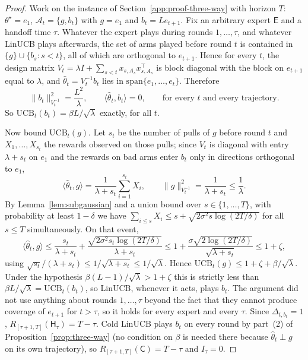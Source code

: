 \documentclass{article}
\theoremstyle{definition}
\theoremstyle{remark}
\theoremstyle{remark}
\newcommand{\Cold}{\mathsf{C}}
\newcommand{\Exp}{\mathsf{E}}
\newcommand{\Hyb}{\mathsf{H}}
\begin{document}
\begin{proof}
Work on the instance of Section~\ref{app:proof-three-way} with horizon $T$:
$\theta^\star=e_1$, $\mathcal A_t=\{g,b_t\}$ with $g=e_1$ and
$b_t=Le_{t+1}$. Fix an arbitrary expert $\Exp$ and a handoff time $\tau$.
Whatever the expert plays during rounds $1,\dots,\tau$, and whatever LinUCB
plays afterwards, the set of arms played before round $t$ is contained in
$\{g\}\cup\{b_s:s<t\}$, all of which are orthogonal to $e_{t+1}$. Hence for
every $t$, the design matrix $V_t=\lambda I+\sum_{s<t}x_{s,A_s}x_{s,A_s}^\top$
is block diagonal with the block on $e_{t+1}$ equal to $\lambda$, and
$\widehat\theta_t=V_t^{-1}b_t$ lies in $\mathrm{span}\{e_1,\dots,e_t\}$. Therefore
\[
\|b_t\|_{V_t^{-1}}^2=\frac{L^2}{\lambda},\qquad \langle\widehat\theta_t,b_t\rangle=0,
\qquad\text{for every }t\text{ and every trajectory.}
\]
So $\mathrm{UCB}_t(b_t)=\beta L/\sqrt\lambda$ exactly, for all $t$.

Now bound $\mathrm{UCB}_t(g)$. Let $s_t$ be the number of pulls of $g$ before
round $t$ and $X_1,\dots,X_{s_t}$ the rewards observed on those pulls; since
$V_t$ is diagonal with entry $\lambda+s_t$ on $e_1$ and the rewards on bad
arms enter $b_t$ only in directions orthogonal to $e_1$,
\[
\langle\widehat\theta_t,g\rangle=\frac{1}{\lambda+s_t}\sum_{i=1}^{s_t}X_i,
\qquad
\|g\|_{V_t^{-1}}^2=\frac{1}{\lambda+s_t}\le\frac1\lambda .
\]
By Lemma~\ref{lem:subgaussian} and a union bound over $s\in\{1,\dots,T\}$,
with probability at least $1-\delta$ we have
$\sum_{i\le s}X_i\le s+\sqrt{2\sigma^2s\log(2T/\delta)}$ for all $s\le T$
simultaneously. On that event,
\[
\langle\widehat\theta_t,g\rangle
\le\frac{s_t}{\lambda+s_t}+\frac{\sqrt{2\sigma^2s_t\log(2T/\delta)}}{\lambda+s_t}
\le 1+\frac{\sigma\sqrt{2\log(2T/\delta)}}{\sqrt{\lambda+s_t}}
\le 1+\zeta ,
\]
using $\sqrt{s_t}/(\lambda+s_t)\le1/\sqrt{\lambda+s_t}\le1/\sqrt\lambda$.
Hence $\mathrm{UCB}_t(g)\le1+\zeta+\beta/\sqrt\lambda$. Under the hypothesis
$\beta(L-1)/\sqrt\lambda>1+\zeta$ this is strictly less than
$\beta L/\sqrt\lambda=\mathrm{UCB}_t(b_t)$, so LinUCB, whenever it acts, plays
$b_t$. The argument did not use anything about rounds $1,\dots,\tau$ beyond
the fact that they cannot produce coverage of $e_{t+1}$ for $t>\tau$, so it
holds for every expert and every $\tau$. Since $\Delta_{t,b_t}=1$,
$R_{[\tau+1,T]}(\Hyb_\tau)=T-\tau$. Cold LinUCB plays $b_t$ on every round by
part~(2) of Proposition~\ref{prop:three-way} (no condition on $\beta$ is
needed there because $\widehat\theta_t\perp g$ on its own trajectory), so
$R_{[\tau+1,T]}(\Cold)=T-\tau$ and $I_\tau=0$.
\end{proof}
\end{document}
